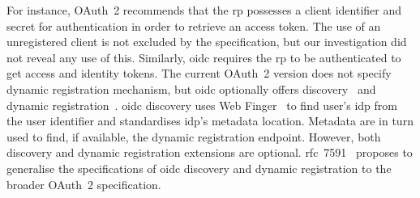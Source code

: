 For instance, OAuth~2 recommends that the \gls{rp} possesses a client identifier and secret for authentication in order to retrieve an access token.
The use of an unregistered client is not excluded by the specification, but our investigation did not reveal any use of this. 
Similarly, \gls{oidc} requires the \gls{rp} to be authenticated to get access and identity tokens. 
The current OAuth~2 version does not specify dynamic registration mechanism, but \gls{oidc} optionally offers discovery~\cite{sakimura_openid_discovery} and dynamic registration~\cite{sakimura_openid_dynreg}.
\gls{oidc} discovery uses Web Finger~\cite{RFC7033} to find user's \gls{idp} from the user identifier and standardises \gls{idp}'s metadata location.
Metadata are in turn used to find, if available, the dynamic registration endpoint. 
However, both discovery and dynamic registration extensions are optional.
\gls{rfc}~7591~\cite{RFC7591} proposes to generalise the specifications of \gls{oidc} discovery and dynamic registration to the broader OAuth~2 specification.


